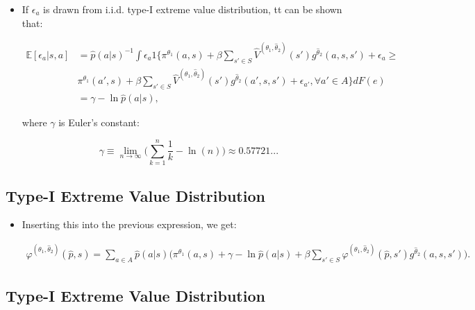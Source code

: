 \documentclass[]{book}
\providecommand{\tightlist}{%
  \setlength{\itemsep}{0pt}\setlength{\parskip}{0pt}}
\begin{document}
\begin{itemize}
\tightlist
\item
  If \(\epsilon_a\) is drawn from i.i.d. type-I extreme value
  distribution, tt can be shown that:

  \begin{equation}
  \begin{split}
  \mathbb{E}[\epsilon_{a}|s, a] &= \hat{p}(a|s)^{-1} \int \epsilon_a 1\Bigg\{\pi^{\theta_1}(a , s) + \beta \sum_{s' \in S} \hat{V}^{(\theta_1, \hat{\theta}_2)}(s') g^{\hat{\theta}_2}(a, s, s') + \epsilon_a \ge\\
  &\pi^{\theta_1}(a' , s) + \beta \sum_{s' \in S} \hat{V}^{(\theta_1, \hat{\theta}_2)}(s') g^{\hat{\theta}_2}(a', s, s') + \epsilon_{a'}, \forall a' \in A \Bigg\}dF(e)\\
  &= \gamma - \ln \hat{p}(a|s),
  \end{split}
  \end{equation}

  where \(\gamma\) is Euler's constant:

  \begin{equation}
  \gamma \equiv \lim_{n \to \infty} \Bigg(\sum_{k = 1}^n \frac{1}{k} - \ln(n) \Bigg) \approx 0.57721...
  \end{equation}
\end{itemize}

\subsection{Type-I Extreme Value
Distribution}\label{type-i-extreme-value-distribution-2}

\begin{itemize}
\tightlist
\item
  Inserting this into the previous expression, we get:

  \begin{equation}
  \begin{split}
  \varphi^{(\theta_1, \hat{\theta}_2)}(\hat{p}, s) = \sum_{a \in A}\hat{p}(a|s)\Bigg(\pi^{\theta_1}(a, s) + \gamma - \ln \hat{p}(a|s) + \beta \sum_{s' \in S} \varphi^{(\theta_1, \hat{\theta}_2)}(\hat{p}, s') g^{\hat{\theta}_2}(a, s, s')  \Bigg).
  \end{split}
  \end{equation}
\end{itemize}

\subsection{Type-I Extreme Value
Distribution}\label{type-i-extreme-value-distribution-3}
\end{document}
